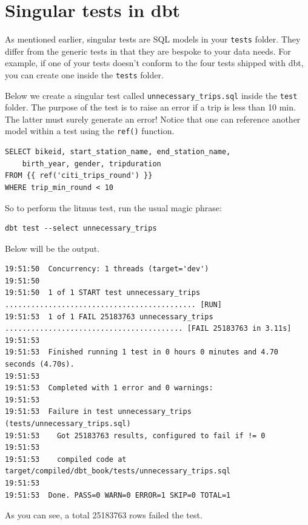 \documentclass[
]{book}
\begin{document}
\hypertarget{singular-tests-in-dbt}{%
\section{Singular tests in dbt}\label{singular-tests-in-dbt}}

As mentioned earlier, singular tests are SQL models in your \texttt{tests} folder. They differ from the generic tests in that they are bespoke to your data needs. For example, if one of your tests doesn't conform to the four tests shipped with dbt, you can create one inside the \texttt{tests} folder.

Below we create a singular test called \texttt{unnecessary\_trips.sql} inside the \texttt{test} folder. The purpose of the test is to raise an error if a trip is less than 10 min. The latter must surely generate an error! Notice that one can reference another model within a test using the \texttt{ref()} function.

\begin{verbatim}
SELECT bikeid, start_station_name, end_station_name,
    birth_year, gender, tripduration
FROM {{ ref('citi_trips_round') }}
WHERE trip_min_round < 10
\end{verbatim}

So to perform the litmus test, run the usual magic phrase:

\begin{verbatim}
dbt test --select unnecessary_trips
\end{verbatim}

Below will be the output.

\begin{verbatim}
19:51:50  Concurrency: 1 threads (target='dev')
19:51:50  
19:51:50  1 of 1 START test unnecessary_trips ............................................ [RUN]
19:51:53  1 of 1 FAIL 25183763 unnecessary_trips ......................................... [FAIL 25183763 in 3.11s]
19:51:53  
19:51:53  Finished running 1 test in 0 hours 0 minutes and 4.70 seconds (4.70s).
19:51:53  
19:51:53  Completed with 1 error and 0 warnings:
19:51:53  
19:51:53  Failure in test unnecessary_trips (tests/unnecessary_trips.sql)
19:51:53    Got 25183763 results, configured to fail if != 0
19:51:53  
19:51:53    compiled code at target/compiled/dbt_book/tests/unnecessary_trips.sql
19:51:53  
19:51:53  Done. PASS=0 WARN=0 ERROR=1 SKIP=0 TOTAL=1
\end{verbatim}

As you can see, a total 25183763 rows failed the test.
\end{document}

